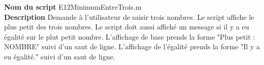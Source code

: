 \textbf{Nom du script}
E12MinimumEntreTrois.m\\
\textbf{Description}
Demande à l'utilisateur de saisir trois nombres. Le script affiche le plus petit des trois nombres. Le script doit aussi affiché un message si il y a eu égalité sur le plut petit nombre. L'affichage de base prends la forme "Plus petit : NOMBRE" suivi d'un saut de ligne. L'affichage de l'égalité prends la forme "Il y a eu égalité." suivi d'un saut de ligne.
